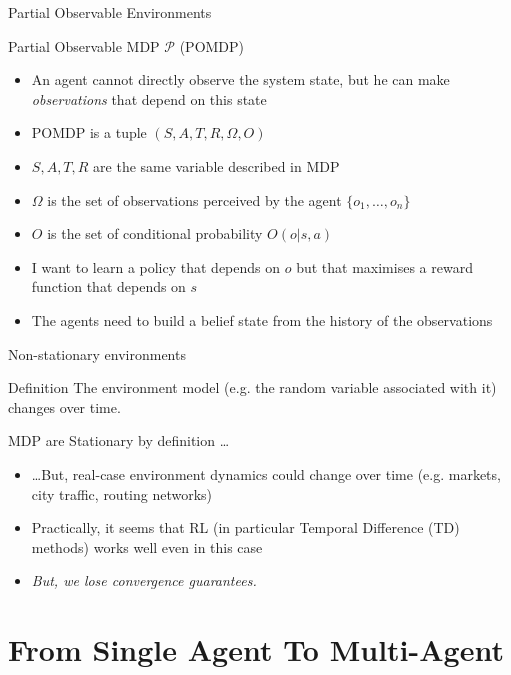 \documentclass[presentation]{beamer}\mode<presentation>{\usetheme{AMSBolognaFC}}
\begin{document}
\begin{frame}{Partial Observable Environments}
	\begin{exampleblock}{Partial Observable MDP $\mathcal{P}$ (POMDP) \href{https://www.pomdp.org/}{\faLink}}
		\begin{itemize}
			\item An agent cannot directly observe the system state, but he can make \emph{observations} that depend on this state
			\item POMDP is a tuple $(S, A, T, R, \Omega, O)$
			\item $S, A, T, R$ are the same variable described in MDP
			\item $\Omega$ is the set of observations perceived by the agent $\{o_1, \dots, o_n\}$
			\item $O$ is the set of conditional probability $O(o | s, a)$
			\item I want to learn a policy that depends on $o$ but that maximises a reward function that depends on $s$
			\item The agents need to build a belief state from the history of the observations
		\end{itemize}
	\end{exampleblock}
\end{frame}
\begin{frame}[c]{Non-stationary environments}
	\begin{alertblock}{Definition}
		The environment model (e.g. the random variable associated with it) changes
		over time.
	\end{alertblock}
	\begin{exampleblock}{MDP are Stationary by definition \dots}
		\begin{itemize}
			\item \dots But, real-case environment dynamics could change over time (e.g. markets, city traffic, routing networks)
			\item Practically, it seems that RL (in particular Temporal Difference (TD) methods) works well even in this case
			\item \emph{But, we lose convergence guarantees.}
		\end{itemize}
	\end{exampleblock}
%
\end{frame}

\section{From Single Agent To Multi-Agent}
\end{document}
